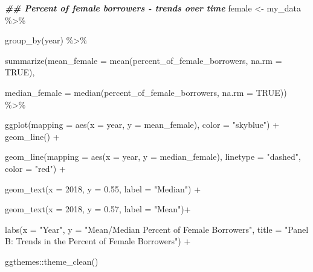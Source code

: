 \documentclass[a4paper,nobind]{templates/ociamthesis}
\newenvironment{Shaded}{\begin{snugshade}}{\end{snugshade}}
\newcommand{\AttributeTok}[1]{\textcolor[rgb]{0.77,0.63,0.00}{#1}}
\newcommand{\ConstantTok}[1]{\textcolor[rgb]{0.00,0.00,0.00}{#1}}
\newcommand{\DecValTok}[1]{\textcolor[rgb]{0.00,0.00,0.81}{#1}}
\newcommand{\DocumentationTok}[1]{\textcolor[rgb]{0.56,0.35,0.01}{\textbf{\textit{#1}}}}
\newcommand{\FloatTok}[1]{\textcolor[rgb]{0.00,0.00,0.81}{#1}}
\newcommand{\FunctionTok}[1]{\textcolor[rgb]{0.00,0.00,0.00}{#1}}
\newcommand{\NormalTok}[1]{#1}
\newcommand{\OtherTok}[1]{\textcolor[rgb]{0.56,0.35,0.01}{#1}}
\newcommand{\SpecialCharTok}[1]{\textcolor[rgb]{0.00,0.00,0.00}{#1}}
\newcommand{\StringTok}[1]{\textcolor[rgb]{0.31,0.60,0.02}{#1}}
\renewenvironment{Shaded}
{
  \vspace{10pt}%
  \begin{snugshade}%
}{%
  \end{snugshade}%
  \vspace{8pt}%
}
\begin{document}
\begin{Shaded}
\begin{Highlighting}[]
\DocumentationTok{\#\# Percent of female borrowers {-} trends over time}
\NormalTok{female }\OtherTok{\textless{}{-}}\NormalTok{ my\_data }\SpecialCharTok{\%\textgreater{}\%} 
  
  \FunctionTok{group\_by}\NormalTok{(year) }\SpecialCharTok{\%\textgreater{}\%} 
  
  \FunctionTok{summarize}\NormalTok{(}\AttributeTok{mean\_female =} \FunctionTok{mean}\NormalTok{(percent\_of\_female\_borrowers, }\AttributeTok{na.rm =} \ConstantTok{TRUE}\NormalTok{), }
                               
  \AttributeTok{median\_female =} \FunctionTok{median}\NormalTok{(percent\_of\_female\_borrowers, }\AttributeTok{na.rm =} \ConstantTok{TRUE}\NormalTok{)) }\SpecialCharTok{\%\textgreater{}\%} 
  
  \FunctionTok{ggplot}\NormalTok{(}\AttributeTok{mapping =} \FunctionTok{aes}\NormalTok{(}\AttributeTok{x =}\NormalTok{ year, }\AttributeTok{y =}\NormalTok{ mean\_female), }\AttributeTok{color =} \StringTok{"skyblue"}\NormalTok{) }\SpecialCharTok{+} \FunctionTok{geom\_line}\NormalTok{() }\SpecialCharTok{+}
  
  \FunctionTok{geom\_line}\NormalTok{(}\AttributeTok{mapping =} \FunctionTok{aes}\NormalTok{(}\AttributeTok{x =}\NormalTok{ year, }\AttributeTok{y =}\NormalTok{ median\_female), }\AttributeTok{linetype =} \StringTok{"dashed"}\NormalTok{, }\AttributeTok{color =} \StringTok{"red"}\NormalTok{) }\SpecialCharTok{+}
  
  \FunctionTok{geom\_text}\NormalTok{(}\AttributeTok{x =} \DecValTok{2018}\NormalTok{, }\AttributeTok{y =} \FloatTok{0.55}\NormalTok{, }\AttributeTok{label =} \StringTok{"Median"}\NormalTok{) }\SpecialCharTok{+} 
  
  \FunctionTok{geom\_text}\NormalTok{(}\AttributeTok{x =} \DecValTok{2018}\NormalTok{, }\AttributeTok{y =} \FloatTok{0.57}\NormalTok{, }\AttributeTok{label =} \StringTok{"Mean"}\NormalTok{)}\SpecialCharTok{+}
  
  \FunctionTok{labs}\NormalTok{(}\AttributeTok{x =} \StringTok{"Year"}\NormalTok{, }\AttributeTok{y =} \StringTok{"Mean/Median Percent of Female Borrowers"}\NormalTok{, }\AttributeTok{title =} \StringTok{"Panel B: Trends in the Percent of Female Borrowers"}\NormalTok{) }\SpecialCharTok{+} 
  
\NormalTok{  ggthemes}\SpecialCharTok{::}\FunctionTok{theme\_clean}\NormalTok{()}


\end{Highlighting}
\end{Shaded}
\end{document}
